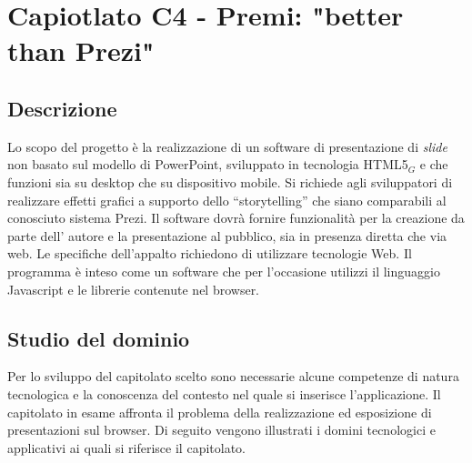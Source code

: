 \section{Capiotlato C4 - Premi: "better than Prezi"}
\subsection{Descrizione}
Lo scopo del progetto è la realizzazione di un software di presentazione di \textit{slide} non basato sul modello di PowerPoint, sviluppato in tecnologia HTML5$_{G}$ e che funzioni sia su desktop che su dispositivo mobile. Si richiede agli sviluppatori di realizzare effetti grafici a supporto dello “storytelling” che siano comparabili al conosciuto sistema Prezi. Il software dovrà fornire funzionalità per la creazione da parte dell' autore e la presentazione al pubblico, sia in presenza diretta che via web. Le specifiche dell'appalto richiedono di utilizzare tecnologie Web. Il programma è inteso come un software che per l'occasione utilizzi il linguaggio Javascript e le librerie contenute nel browser.

\subsection{Studio del dominio}
Per lo sviluppo del capitolato scelto sono necessarie alcune competenze di natura tecnologica e la conoscenza del contesto nel quale si inserisce l’applicazione. Il capitolato in esame affronta il problema della realizzazione ed esposizione di presentazioni sul browser. Di seguito vengono illustrati i domini tecnologici e applicativi ai quali si riferisce il capitolato.

